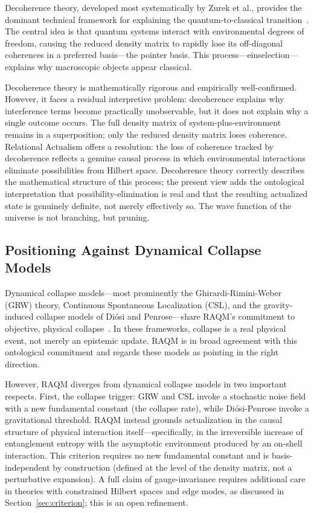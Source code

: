 \documentclass[11pt,a4paper]{article}
\theoremstyle{plain}
\theoremstyle{definition}
\theoremstyle{remark}
\begin{document}
Decoherence theory, developed most systematically by Zurek et al., provides the
dominant technical framework for explaining the quantum-to-classical
transition~\citep{Zurek1981,Zurek2003,JoosZeh1985}. The central idea is that
quantum systems interact with environmental degrees of freedom, causing the reduced
density matrix to rapidly lose its off-diagonal coherences in a preferred
basis---the pointer basis. This process---einselection---explains why macroscopic
objects appear classical.

Decoherence theory is mathematically rigorous and empirically well-confirmed.
However, it faces a residual interpretive problem: decoherence explains why
interference terms become practically unobservable, but it does not explain why a
single outcome occurs. The full density matrix of system-plus-environment remains
in a superposition; only the reduced density matrix loses coherence. Relational
Actualism offers a resolution: the loss of coherence tracked by decoherence
reflects a genuine causal process in which environmental interactions eliminate
possibilities from Hilbert space. Decoherence theory correctly describes the
mathematical structure of this process; the present view adds the ontological
interpretation that possibility-elimination is real and that the resulting
actualized state is genuinely definite, not merely effectively so. The wave
function of the universe is not branching, but pruning.

\subsection{Positioning Against Dynamical Collapse Models}
\label{sec:collapse}

Dynamical collapse models---most prominently the Ghirardi-Rimini-Weber (GRW)
theory, Continuous Spontaneous Localization (CSL), and the gravity-induced
collapse models of Di\'{o}si and Penrose---share RAQM's commitment to objective,
physical collapse~\citep{Bassi2013}. In these frameworks, collapse is a real
physical event, not merely an epistemic update. RAQM is in broad agreement with
this ontological commitment and regards these models as pointing in the right
direction.

However, RAQM diverges from dynamical collapse models in two important respects.
First, the collapse trigger: GRW and CSL invoke a stochastic noise field with a
new fundamental constant (the collapse rate), while Di\'{o}si-Penrose invoke a
gravitational threshold. RAQM instead grounds actualization in the causal
structure of physical interaction itself---specifically, in the irreversible
increase of entanglement entropy with the asymptotic environment produced by an
on-shell interaction. This criterion requires no new fundamental constant and is
basis-independent by construction (defined at the level of the density matrix, not
a perturbative expansion). A full claim of gauge-invariance requires additional
care in theories with constrained Hilbert spaces and edge modes, as discussed in
Section~\ref{sec:criterion}; this is an open refinement.
\end{document}

